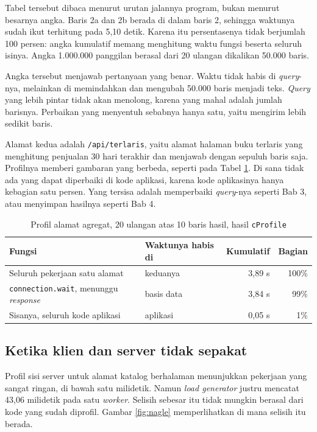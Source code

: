Tabel tersebut dibaca menurut urutan jalannya program, bukan menurut
besarnya angka. Baris 2a dan 2b berada di dalam baris 2, sehingga waktunya
sudah ikut terhitung pada 5,10 detik. Karena itu persentasenya tidak
berjumlah 100 persen: angka kumulatif memang menghitung waktu fungsi beserta
seluruh isinya. Angka 1.000.000 panggilan berasal dari 20 ulangan dikalikan
50.000 baris.

Angka tersebut menjawab pertanyaan yang benar. Waktu tidak habis di \textit{query}-nya,
melainkan di memindahkan dan mengubah 50.000 baris menjadi teks. \textit{Query} yang
lebih pintar tidak akan menolong, karena yang mahal adalah jumlah barisnya.
Perbaikan yang menyentuh sebabnya hanya satu, yaitu mengirim lebih sedikit
baris.

Alamat kedua adalah \texttt{/api/terlaris}, yaitu alamat halaman buku
terlaris yang menghitung penjualan 30 hari terakhir dan menjawab dengan
sepuluh baris saja. Profilnya memberi gambaran yang berbeda, seperti pada
Tabel \ref{tab:profil-agregat}. Di sana tidak ada yang dapat diperbaiki di kode
aplikasi, karena kode aplikasinya hanya kebagian satu persen. Yang tersisa
adalah memperbaiki \textit{query}-nya seperti Bab 3, atau menyimpan hasilnya
seperti Bab 4.

\begin{table}[!htb]
  \centering
  \caption{Profil alamat agregat, 20 ulangan atas 10 baris hasil, hasil
           \texttt{cProfile}}
  \label{tab:profil-agregat}
  \begin{tabularx}{\textwidth}{Xlrr}
    \hline
    \textbf{Fungsi} & \textbf{Waktunya habis di} & \textbf{Kumulatif} & \textbf{Bagian} \\
    \hline
    Seluruh pekerjaan satu alamat & keduanya & 3,89 s & 100\% \\
    \hline
    \texttt{connection.wait}, menunggu \textit{response} & basis data & 3,84 s & 99\% \\
    \hline
    Sisanya, seluruh kode aplikasi & aplikasi & 0,05 s & 1\% \\
    \hline
  \end{tabularx}
\end{table}

\subsection*{Ketika klien dan server tidak sepakat}

Profil sisi server untuk alamat katalog berhalaman menunjukkan pekerjaan yang
sangat ringan, di bawah satu milidetik. Namun \textit{load generator} justru
mencatat 43,06 milidetik pada satu \textit{worker}. Selisih sebesar itu tidak
mungkin berasal dari kode yang sudah diprofil. Gambar \ref{fig:nagle}
memperlihatkan di mana selisih itu berada.

